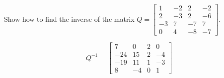 
\begin{exerciseStatement}


Show how to find the inverse of the matrix \(Q= \left[\begin{array}{cccc}
1 & -2 & 2 & -2 \\
2 & -3 & 2 & -6 \\
-3 & 7 & -7 & 7 \\
0 & 4 & -8 & -7
\end{array}\right] \).


\end{exerciseStatement}
    
\begin{exerciseAnswer} 
\[Q^{-1}= \left[\begin{array}{cccc}
7 & 0 & 2 & 0 \\
-24 & 15 & 2 & -4 \\
-19 & 11 & 1 & -3 \\
8 & -4 & 0 & 1
\end{array}\right] \]
\end{exerciseAnswer}
    
